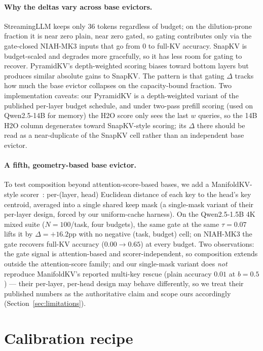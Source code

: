 \documentclass{article}
\begin{document}
\paragraph{Why the deltas vary across base evictors.} StreamingLLM keeps only
$36$ tokens regardless of budget; on the dilution-prone fraction it is near
zero plain, near zero gated, so gating contributes only via the gate-closed
NIAH-MK3 inputs that go from $0$ to full-KV accuracy. SnapKV is budget-scaled
and degrades more gracefully, so it has less room for gating to recover.
PyramidKV's depth-weighted scoring biases toward bottom layers but produces
similar absolute gains to SnapKV. The pattern is that gating $\Delta$ tracks how
much the base evictor collapses on the capacity-bound fraction. Two
implementation caveats: our PyramidKV is a depth-weighted variant of the
published per-layer budget schedule, and under two-pass prefill scoring
(used on Qwen2.5-14B for memory) the H2O score only sees the last $w$
queries, so the 14B H2O column degenerates toward SnapKV-style scoring; its
$\Delta$ there should be read as a near-duplicate of the SnapKV cell rather
than an independent base evictor.

\paragraph{A fifth, geometry-based base evictor.} To test composition
beyond attention-score-based bases, we add a ManifoldKV-style
scorer~\citep{arxiv260208343}: per-(layer, head) Euclidean distance of
each key to the head's key centroid, averaged into a single shared keep
mask (a single-mask variant of their per-layer design, forced by our
uniform-cache harness). On the Qwen2.5-1.5B 4K mixed suite
($N = 100$/task, four budgets), the same gate at the same $\tau = 0.07$
lifts it by $\Delta = +16.2$pp with no negative (task, budget) cell; on
NIAH-MK3 the gate recovers full-KV accuracy ($0.00 \to 0.65$) at every
budget. Two observations: the gate signal is attention-based and
scorer-independent, so composition extends outside the attention-score
family; and our single-mask variant does \emph{not} reproduce
ManifoldKV's reported multi-key rescue (plain accuracy $0.01$ at
$b = 0.5$) --- their per-layer, per-head design may behave differently,
so we treat their published numbers as the authoritative claim and scope
ours accordingly (Section~\ref{sec:limitations}).

\section{Calibration recipe}
\label{sec:recipe}
\end{document}
